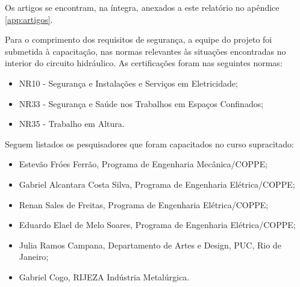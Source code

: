 Os artigos se encontram, na íntegra, anexados a este relatório no apêndice
\ref{app:artigos}.



Para o comprimento dos requisitos de segurança, a equipe do projeto foi submetida à capacitação, nas
normas relevantes às situações encontradas no interior do circuito hidráulico. As certificações foram nas
seguintes normas:

\begin{itemize}
  \item NR10 - Segurança e Instalações e Serviços em Eletricidade;
  \item NR33 - Segurança e Saúde nos Trabalhos em Espaços Confinados;
  \item NR35 - Trabalho em Altura.
\end{itemize}

Seguem listados os pesquisadores que foram capacitados no curso
supracitado:

\begin{itemize}
  \item Estevão Fróes Ferrão, Programa de Engenharia Mecânica/COPPE;
  \item Gabriel Alcantara Costa Silva, Programa de Engenharia Elétrica/COPPE;
  \item Renan Sales de Freitas, Programa de Engenharia Elétrica/COPPE;
  \item Eduardo Elael de Melo Soares, Programa de Engenharia Elétrica/COPPE;
  \item Julia Ramos Campana, Departamento de Artes e Design, PUC, Rio de
  Janeiro;
  \item Gabriel Cogo, RIJEZA Indústria Metalúrgica.
\end{itemize}

% 


